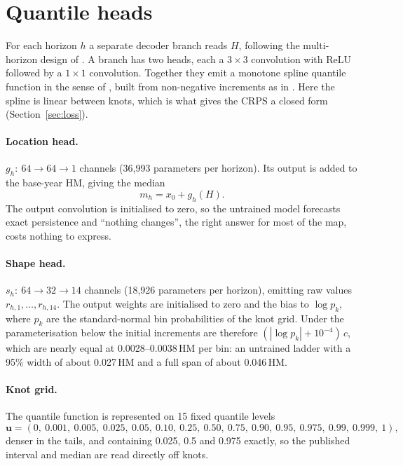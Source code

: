 \documentclass[11pt,a4paper]{article}
\begin{document}
\section{Quantile heads}
\label{sec:heads}

For each horizon $h$ a separate decoder branch reads $H$, following the multi-horizon design of
\citet{wen}. A branch has two heads, each a $3\times3$ convolution with ReLU followed by a
$1\times1$ convolution. Together they emit a monotone spline quantile function in the sense of
\citet{gasthaus}, built from non-negative increments as in \citet{park}. Here the spline is
linear between knots, which is what gives the CRPS a closed form (Section~\ref{sec:loss}).

\paragraph{Location head.} $g_h:\ 64\to64\to1$ channels (36,993 parameters per horizon). Its
output is added to the base-year HM, giving the median
\[
m_h = x_0 + g_h(H).
\]
The output convolution is initialised to zero, so the untrained model forecasts exact
persistence and ``nothing changes'', the right answer for most of the map, costs nothing to
express.

\paragraph{Shape head.} $s_h:\ 64\to32\to14$ channels (18,926 parameters per horizon), emitting
raw values $r_{h,1},\dots,r_{h,14}$. The output weights are initialised to zero and the bias to
$\log p_k$, where $p_k$ are the standard-normal bin probabilities of the knot grid. Under the
parameterisation below the initial increments are therefore $(|\log p_k|+10^{-4})\,c$, which are
nearly equal at 0.0028--0.0038\,HM per bin: an untrained ladder with a 95\% width of about
0.027\,HM and a full span of about 0.046\,HM.

\paragraph{Knot grid.} The quantile function is represented on 15 fixed quantile levels
\[
\mathbf{u} = (0,\ 0.001,\ 0.005,\ 0.025,\ 0.05,\ 0.10,\ 0.25,\ 0.50,\ 0.75,\ 0.90,\ 0.95,\
0.975,\ 0.99,\ 0.999,\ 1),
\]
denser in the tails, and containing 0.025, 0.5 and 0.975 exactly, so the published interval and
median are read directly off knots.
\end{document}
